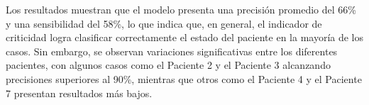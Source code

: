\begin{table}[H]
  \centering
  \caption{Resultados cuantitativos de la validación del modelo de detección de anomalías en subespacios.}
  \label{tab:resultados_cuantitativos}
\end{table}

Los resultados muestran que el modelo presenta una precisión promedio del 66\% y una sensibilidad del 58\%, lo que indica que, en general, el indicador de criticidad logra clasificar correctamente el estado del paciente en la mayoría de los casos. Sin embargo, se observan variaciones significativas entre los diferentes pacientes, con algunos casos como el Paciente 2 y el Paciente 3 alcanzando precisiones superiores al 90\%, mientras que otros como el Paciente 4 y el Paciente 7 presentan resultados más bajos.

